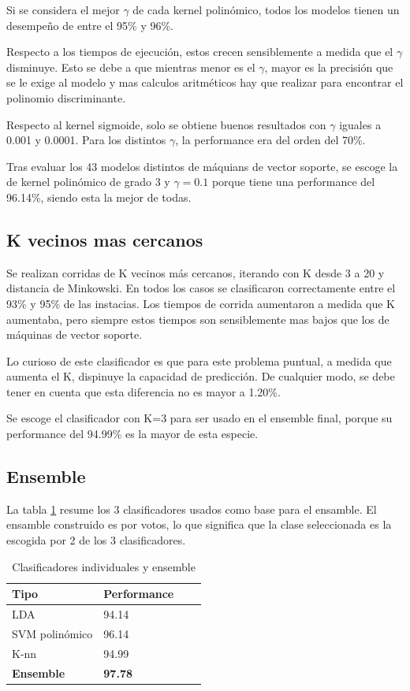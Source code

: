 \documentclass[journal]{IEEEtran}
\begin{document}
Si se considera el mejor $\gamma$ de cada kernel polinómico, todos los modelos tienen un
desempeño de entre el 95\% y 96\%.

Respecto a los tiempos de ejecución, estos crecen sensiblemente a medida que el $\gamma$ 
disminuye. Esto se debe a que mientras menor es el $\gamma$, mayor es la precisión que 
se le exige al modelo y mas calculos aritméticos hay que realizar para encontrar
el polinomio discriminante. 

Respecto al kernel sigmoide, solo se obtiene buenos resultados con $\gamma$ iguales
a 0.001 y 0.0001. Para los distintos $\gamma$, la performance era del orden del
70\%.

Tras evaluar los 43 modelos distintos de máquians de vector soporte, se escoge
la de kernel polinómico de grado 3 y $\gamma=0.1$ porque tiene una performance del
96.14\%, siendo esta la mejor de todas.

\subsection{K vecinos mas cercanos}
Se realizan corridas de K vecinos más cercanos, iterando con K desde
3 a 20 y distancia de Minkowski. En todos los casos se clasificaron
correctamente entre el 93\% y 95\% de las instacias. Los tiempos de corrida aumentaron
a medida que K aumentaba, pero siempre estos tiempos son sensiblemente
mas bajos que los de máquinas de vector soporte.

Lo curioso de este clasificador es que para este problema puntual, a medida
que aumenta el K, dispinuye la capacidad de predicción. De cualquier modo,
se debe tener en cuenta que esta diferencia no es mayor a 1.20\%.

Se escoge el clasificador con K=3 para ser usado en el ensemble final,
porque su performance del 94.99\% es la mayor de esta especie.

\subsection{Ensemble}
La tabla \ref{table:ensemble_summary} resume los 3 clasificadores usados 
como base para el ensamble. El ensamble construido es por votos, lo que
significa que la clase seleccionada es la escogida por 2 de los
3 clasificadores.

\begin{table}[ht!]
\caption{Clasificadores individuales y ensemble}
\label{table:ensemble_summary}
\centering
\begin{tabular}{l | l l l }
Tipo & Performance  \\
\hline
LDA & 94.14 \\
SVM polinómico & 96.14 \\
K-nn & 94.99 \\
\hline
\textbf{Ensemble} & \textbf{97.78} \\
\end{tabular}
\end{table}
\end{document}
